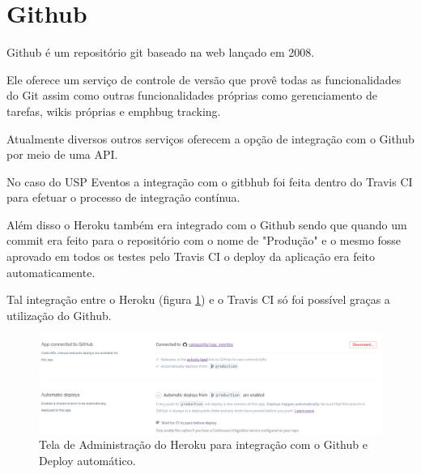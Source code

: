 \section{Github}
\par Github é um repositório git baseado na web lançado em 2008.
\par Ele oferece um serviço de controle de versão que provê todas as funcionalidades do Git assim como outras funcionalidades próprias como gerenciamento de tarefas, wikis próprias e emph{bug tracking}.
\par Atualmente diversos outros serviços oferecem a opção de integração com o Github por meio de uma API.
\par No caso do USP Eventos a integração com o gitbhub foi feita dentro do Travis CI para efetuar o processo de integração contínua.
\par Além disso o Heroku também era integrado com o Github sendo que quando um commit era feito para o repositório com o nome de "Produção" e o mesmo fosse aprovado em todos os testes pelo Travis CI o deploy da aplicação era feito automaticamente.
\par Tal integração entre o Heroku (figura \ref{fig:heroku_automatic_deploy}) e o Travis CI só foi possível graças a utilização do Github.
\begin{figure}[htb]
\centering
\includegraphics[width=15cm]{figuras/heroku_automatic_deploy}
\caption{\label{fig:heroku_automatic_deploy} Tela de Administração do Heroku para integração com o Github e Deploy automático.}
\end{figure}
 

